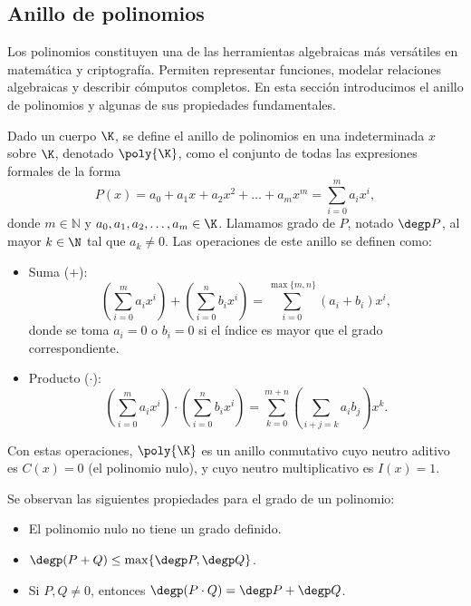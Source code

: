 
\subsection{Anillo de polinomios}

Los polinomios constituyen una de las herramientas algebraicas más versátiles en matemática y criptografía. Permiten representar funciones, modelar relaciones algebraicas y describir cómputos completos. En esta sección introducimos el anillo de polinomios y algunas de sus propiedades fundamentales.

\begin{definition}
	Dado un cuerpo $\K$, se define el anillo de polinomios en una indeterminada $x$ sobre $\K$, denotado $\poly{\K}$, como el conjunto de todas las expresiones formales de la forma
	$$P(x) = a_0 + a_1x + a_2x^2 + \ldots + a_mx^m = \sum_{i=0}^{m} a_i x^i,$$
	donde $m \in \mathbb{N}$ y $a_0, a_1, a_2, \ldots, a_m \in \K$. Llamamos grado de $P$, notado $\degp P$, al mayor $k \in \N$ tal que $a_k \neq 0$. Las operaciones de este anillo se definen como:
	\begin{itemize}
		\item Suma ($+$): $$\left(\sum_{i=0}^{m} a_i x^i\right) + \left(\sum_{i=0}^{n} b_i x^i\right) = \sum_{i=0}^{\max\{m,n\}} (a_i + b_i) x^i,$$
		donde se toma $a_i = 0$ o $b_i = 0$ si el índice es mayor que el grado correspondiente.
		\item Producto ($\cdot$): $$\left(\sum_{i=0}^{m} a_i x^i\right) \cdot \left(\sum_{i=0}^{n} b_i x^i\right) = \sum_{k=0}^{m+n}\left(\sum_{i+j=k}a_ib_j\right)x^k.$$
	\end{itemize}
	
	Con estas operaciones, $\poly{\K}$ es un anillo conmutativo cuyo neutro aditivo es $C(x) = 0$ (el polinomio nulo), y cuyo neutro multiplicativo es $I(x) = 1$.
\end{definition}

Se observan las siguientes propiedades para el grado de un polinomio:

\begin{itemize}
	\item El polinomio nulo no tiene un grado definido.
	\item $\degp(P + Q) \leq \max\{\degp P, \degp Q\}$.
	\item Si $P, Q \neq 0$, entonces $\degp(P \cdot Q) = \degp P + \degp Q$.
\end{itemize}

